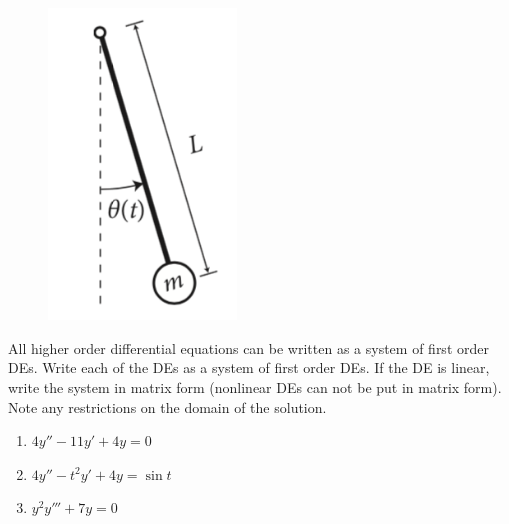 \begin{figure}[ht!]
\centering
\includegraphics[width=50mm]{7p2.jpg}
\end{figure}

\newpage
\hfill
\newpage


\begin{problem}[3]
All higher order differential equations can be written as a system of first order DEs. Write each of the DEs as a system of first order DEs. If the DE is linear, write the system in matrix form (nonlinear DEs can not be put in matrix form). Note any restrictions on the domain of the solution.

\begin{enumerate}
\item $4y'' -11y' +4y = 0$ 
\item $4y'' - t^2y' + 4y = \sin t$
\item $y^2y''' + 7y = 0$
\end{enumerate}
\end{problem}

\newpage


